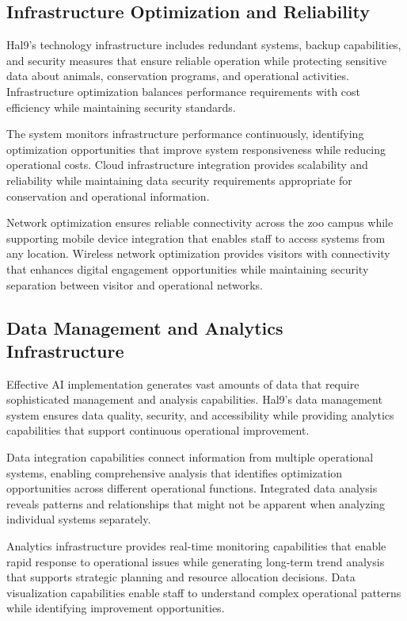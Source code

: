 \documentclass[
  Letterpaper,
]{scrbook}
\begin{document}
\subsection{Infrastructure Optimization and
Reliability}\label{infrastructure-optimization-and-reliability}

Hal9's technology infrastructure includes redundant systems, backup
capabilities, and security measures that ensure reliable operation while
protecting sensitive data about animals, conservation programs, and
operational activities. Infrastructure optimization balances performance
requirements with cost efficiency while maintaining security standards.

The system monitors infrastructure performance continuously, identifying
optimization opportunities that improve system responsiveness while
reducing operational costs. Cloud infrastructure integration provides
scalability and reliability while maintaining data security requirements
appropriate for conservation and operational information.

Network optimization ensures reliable connectivity across the zoo campus
while supporting mobile device integration that enables staff to access
systems from any location. Wireless network optimization provides
visitors with connectivity that enhances digital engagement
opportunities while maintaining security separation between visitor and
operational networks.

\subsection{Data Management and Analytics
Infrastructure}\label{data-management-and-analytics-infrastructure}

Effective AI implementation generates vast amounts of data that require
sophisticated management and analysis capabilities. Hal9's data
management system ensures data quality, security, and accessibility
while providing analytics capabilities that support continuous
operational improvement.

Data integration capabilities connect information from multiple
operational systems, enabling comprehensive analysis that identifies
optimization opportunities across different operational functions.
Integrated data analysis reveals patterns and relationships that might
not be apparent when analyzing individual systems separately.

Analytics infrastructure provides real-time monitoring capabilities that
enable rapid response to operational issues while generating long-term
trend analysis that supports strategic planning and resource allocation
decisions. Data visualization capabilities enable staff to understand
complex operational patterns while identifying improvement
opportunities.
\end{document}
